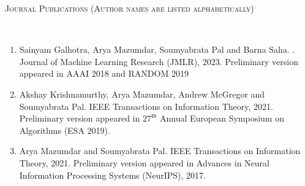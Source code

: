 \documentclass[9pt]{article}
\newenvironment{changemargin}[2]{%
  \begin{list}{}{%
    \setlength{\topsep}{0pt}%
    \setlength{\leftmargin}{0pt}%
    \setlength{\rightmargin}{#2}%
    \setlength{\listparindent}{\parindent}%
    \setlength{\itemindent}{\parindent}%
    \setlength{\parsep}{\parskip}%
  }%
  \item[]}{\end{list}
}
\newcommand{\lineover}{
	\begin{changemargin}{-0.05in}{-0.05in}
		\vspace*{-8pt}
		\hrulefill \\
		\vspace*{-2pt}
	\end{changemargin}
}
\newcommand{\header}[1]{
	\begin{changemargin}{-0.5in}{-0.5in}
		\scshape{#1}\\
  	\lineover
	\end{changemargin}
}
\begin{document}
\header{Journal Publications (Author names are listed alphabetically)}
\begin{enumerate}

\item Sainyam Galhotra, Arya Mazumdar, Soumyabrata Pal and Barna Saha. \href{https://arxiv.org/abs/2206.11303}{ }. Journal of Machine Learning Research (JMLR), 2023. Preliminary version appeared in AAAI 2018 and RANDOM 2019 

\item Akshay Krishnamurthy, Arya Mazumdar, Andrew McGregor and Soumyabrata Pal. \href{https://arxiv.org/pdf/1904.09618.pdf}{ } IEEE Transactions on Information Theory, 2021. Preliminary version appeared in $27^{\mathsf{th}}$ Annual European Symposium on Algorithms (ESA 2019).

\item Arya Mazumdar and Soumyabrata Pal. \href{https://arxiv.org/abs/1904.00507}{} IEEE Transactions on Information Theory, 2021. Preliminary version appeared in Advances in Neural Information Processing Systems (NeurIPS), 2017.
\end{enumerate}
\end{document}

